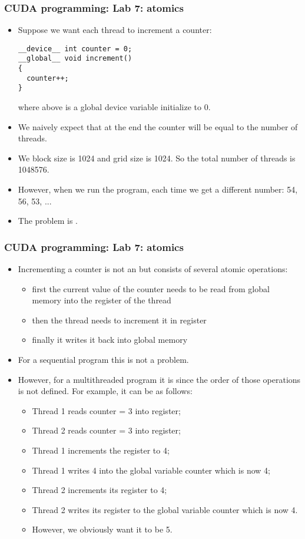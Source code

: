\begin{frame}[fragile]
  \frametitle{CUDA programming: Lab 7: atomics}
\begin{itemize}
\item Suppose we want each thread to increment a counter:
{\color{mycolorcode}
\begin{verbatim}
__device__ int counter = 0;
__global__ void increment()
{
  counter++;
}
\end{verbatim}
}
where  above is a global device variable initialize to 0.
\item We naively expect that at the end the counter will be equal to the number of threads.
\item We block size is 1024 and grid size is 1024. So the total number of threads is 1048576.
\item However, when we run the program, each time we get a different number: 54, 56, 53, ...
\item The problem is .
\end{itemize}
\end{frame}


\begin{frame}[fragile]
  \frametitle{CUDA programming: Lab 7: atomics}
\begin{itemize}
\item Incrementing a counter is not an  but consists of several atomic operations: 
  \begin{itemize}
  \item first the current value of the counter needs to be read from global memory into the register of the thread
  \item then the thread needs to increment it in register
  \item finally it writes it back into global memory
  \end{itemize}
\item For a sequential program this is not a problem.
\item However, for a multithreaded program it is since the order of those operations is not defined. For example, it can be as follows:
  \begin{itemize}
  \item Thread 1 reads counter = 3 into register;
  \item Thread 2 reads counter = 3 into register;
  \item Thread 1 increments the register to 4;
  \item Thread 1 writes 4 into the global variable counter which is now 4;
  \item Thread 2 increments its register to 4;
  \item Thread 2 writes its register to the global variable counter which is now 4.
  \item However, we obviously want it to be 5.
  \end{itemize}
\end{itemize}
\end{frame}
  

